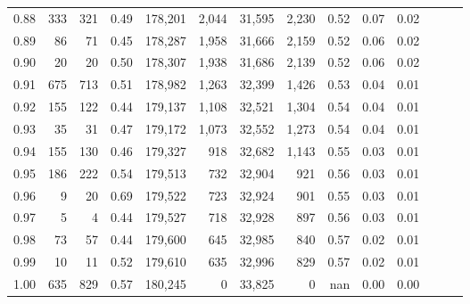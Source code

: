 \begin{tabular}{rrrrrrrrrrrrrr}
0.88 &     333 &    321 &  0.49 &  178,201 &    2,044 &  31,595 &   2,230 &  0.52 &  0.07 &      0.02 \\
0.89 &      86 &     71 &  0.45 &  178,287 &    1,958 &  31,666 &   2,159 &  0.52 &  0.06 &      0.02 \\
0.90 &      20 &     20 &  0.50 &  178,307 &    1,938 &  31,686 &   2,139 &  0.52 &  0.06 &      0.02 \\
0.91 &     675 &    713 &  0.51 &  178,982 &    1,263 &  32,399 &   1,426 &  0.53 &  0.04 &      0.01 \\
0.92 &     155 &    122 &  0.44 &  179,137 &    1,108 &  32,521 &   1,304 &  0.54 &  0.04 &      0.01 \\
0.93 &      35 &     31 &  0.47 &  179,172 &    1,073 &  32,552 &   1,273 &  0.54 &  0.04 &      0.01 \\
0.94 &     155 &    130 &  0.46 &  179,327 &      918 &  32,682 &   1,143 &  0.55 &  0.03 &      0.01 \\
0.95 &     186 &    222 &  0.54 &  179,513 &      732 &  32,904 &     921 &  0.56 &  0.03 &      0.01 \\
0.96 &       9 &     20 &  0.69 &  179,522 &      723 &  32,924 &     901 &  0.55 &  0.03 &      0.01 \\
0.97 &       5 &      4 &  0.44 &  179,527 &      718 &  32,928 &     897 &  0.56 &  0.03 &      0.01 \\
0.98 &      73 &     57 &  0.44 &  179,600 &      645 &  32,985 &     840 &  0.57 &  0.02 &      0.01 \\
0.99 &      10 &     11 &  0.52 &  179,610 &      635 &  32,996 &     829 &  0.57 &  0.02 &      0.01 \\
1.00 &     635 &    829 &  0.57 &  180,245 &        0 &  33,825 &       0 &   nan &  0.00 &      0.00 \\
\bottomrule
\end{tabular}
